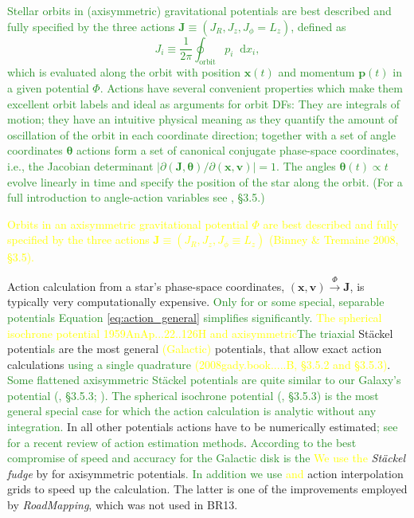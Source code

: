 \documentclass[iop,revtex4,numberedappendix,appendixfloats]{emulateapj}
\newcommand{\vect}[1]{\boldsymbol{#1}}
\newcommand*\diff{\mathop{}\!\mathrm{d}}
\newcommand{\RM}{{\sl RoadMapping}}
\newcommand{\NEW}[1]{\textcolor{ForestGreen}{#1}}
\newcommand{\OLD}[1]{\textcolor{Yellow}{#1}}%
\begin{document}
\NEW{Stellar orbits in (axisymmetric) gravitational potentials are best described and fully specified by the three actions $\vect{J} \equiv (J_R, J_z, J_\phi=L_z)$, defined as
\begin{equation}
J_i \equiv \frac{1}{2\pi} \oint_\text{orbit} p_i \diff x_i, \label{eq:action_general}
\end{equation}
which is evaluated along the orbit with position $\vect{x}(t)$ and momentum $\vect{p}(t)$ in a given potential $\Phi$. Actions have several convenient properties which make them excellent orbit labels and ideal as arguments for orbit DFs: They are integrals of motion; they have an intuitive physical meaning as they quantify the amount of oscillation of the orbit in each coordinate direction; together with a set of angle coordinates $\vect{\theta}$ actions form a set of canonical conjugate phase-space coordinates, i.e., the Jacobian determinant $\left| \partial(\vect{J},\vect{\theta}) / \partial (\vect{x},\vect{v}) \right|=1$. The angles $\vect{\theta}(t)\propto t$ evolve linearly in time and specify the position of the star along the orbit. (For a full introduction to angle-action variables see \citealt{2008gady.book.....B}, \S 3.5.)}

\OLD{Orbits in an axisymmetric gravitational potential $\Phi$ are best described and fully specified by the three actions $\vect{J} \equiv (J_R, J_z, J_\phi\equiv L_z)$ (Binney \& Tremaine 2008, \S 3.5).} 

Action calculation from a star's phase-space coordinates, $(\vect{x},\vect{v}) \stackrel{\Phi}{\longrightarrow} \vect{J}$, is typically very computationally expensive. \NEW{Only for or some special, separable potentials Equation \eqref{eq:action_general} simplifies significantly.} \OLD{The spherical isochrone potential 1959AnAp...22..126H and axisymmetric}\NEW{The triaxial} St\"{a}ckel potential\NEW{s} \citep{1985MNRAS.216..273D} are the most general  \OLD{(Galactic)} potentials, that allow exact action calculations \NEW{using a single quadrature} \OLD{(2008gady.book.....B, \S 3.5.2 and \S 3.5.3)}. \NEW{Some flattened axisymmetric St\"{a}ckel potentials are quite similar to our Galaxy's potential (\citealt{2008gady.book.....B}, \S 3.5.3; \citealt{1994AA...287...43B,2003MNRAS.340..752F}). The spherical isochrone potential (\citealt{1959AnAp...22..126H,2008gady.book.....B}, \S 3.5.3) is the most general special case for which the action calculation is analytic without any integration.} In all other potentials actions have to be numerically estimated\NEW{; see \citet{2016MNRAS.457.2107S} for a recent review of action estimation methods}. \NEW{According to \citet{2016MNRAS.457.2107S} the best compromise of speed and accuracy for the Galactic disk is the} \OLD{We use the} \emph{St\"{a}ckel fudge} by \citet{2012MNRAS.426.1324B} for axisymmetric potentials\NEW{. In addition we use} \OLD{and} action interpolation grids \citep{2012MNRAS.426.1324B,2015ApJS..216...29B} to speed up the calculation. The latter is one of the improvements employed by \RM{}, which was not used in BR13. 
\end{document}
